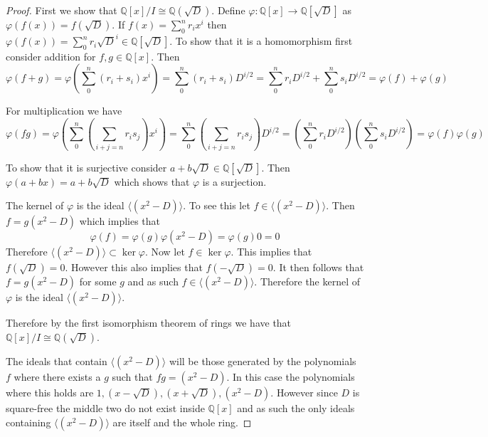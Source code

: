 \documentclass[10pt]{article}
\newcommand{\bb}[1]{\mathbb{#1}}
\theoremstyle{plain}
\theoremstyle{remark}
\begin{document}
\begin{proof}
  First we show that $\bb{Q}[x]/I\cong\bb{Q}(\sqrt{D})$. Define
  $\varphi:\bb{Q}[x]\rightarrow \bb{Q}[\sqrt{D}]$ as $\varphi(f(x))=f(\sqrt{D})$. If
  $f(x)=\sum_0^nr_ix^i$ then $\varphi(f(x))=\sum_0^nr_i\sqrt{D}^{i}\in\bb{Q}[\sqrt{D}]$.
  To show that it is a homomorphism first consider addition for $f,g\in\bb{Q}[x]$.
  Then
  \[ \varphi(f+g)=\varphi(\sum_0^n(r_i+s_i)x^i)  = \sum_0^n(r_i+s_i)D^{i/2}=\sum_0^nr_iD^{i/2}+\sum_0^ns_iD^{i/2}=\varphi(f)+\varphi(g)\]

  For multiplication we have
  \[ \varphi(fg)=\varphi(\sum_0^n\left(\sum_{i+j=n}r_is_j\right)x^i)=\sum_0^n\left(\sum_{i+j=n}r_is_j\right)D^{i/2}
  = \left(\sum_0^nr_iD^{i/2}\right)\left(\sum_0^ns_iD^{i/2}\right)=\varphi(f)\varphi(g)\]

  To show that it is surjective consider $a+b\sqrt{D}\in\bb{Q}[\sqrt{D}]$.
  Then $\varphi(a+bx)=a+b\sqrt{D}$ which shows that $\varphi$ is a surjection.
  
  The kernel of $\varphi$ is the ideal $\langle(x^2-D)\rangle$. To see this let
  $f\in\langle(x^2-D)\rangle$. Then $f=g(x^2-D)$ which implies that
  \[ \varphi(f)=\varphi(g)\varphi(x^2-D)=\varphi(g)0=0\]
  Therefore $\langle(x^2-D)\rangle\subset\ker\varphi$. Now let $f\in\ker\varphi$. This implies that
  $f(\sqrt{D})=0$. However this also implies that $f(-\sqrt{D})=0$.
  It then follows that $f=g(x^2-D)$ for some $g$ and as such
  $f\in\langle(x^2-D)\rangle$. Therefore the kernel of $\varphi$ is the ideal $\langle(x^2-D)\rangle$.
  
  Therefore by the first isomorphism theorem of rings we have that
  $\bb{Q}[x]/I\cong \bb{Q}(\sqrt{D})$.

  The ideals that contain $\langle(x^2-D)\rangle$ will be those generated by
  the polynomials $f$ where there exists a $g$ such that $fg=(x^2-D)$.
  In this case the polynomials where this holds are $1,(x-\sqrt{D}),(x+\sqrt{D}),(x^2-D)$.
  However since $D$ is square-free the middle two do not exist inside $\bb{Q}[x]$
  and as such the only ideals containing $\langle(x^2-D)\rangle$ are itself and the whole
  ring.
  \end{proof}

\end{document}
